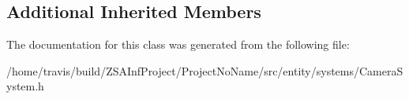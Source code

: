 \subsection*{Additional Inherited Members}


The documentation for this class was generated from the following file\-:\begin{DoxyCompactItemize}
\item 
/home/travis/build/\-Z\-S\-A\-Inf\-Project/\-Project\-No\-Name/src/entity/systems/Camera\-System.\-h\end{DoxyCompactItemize}

